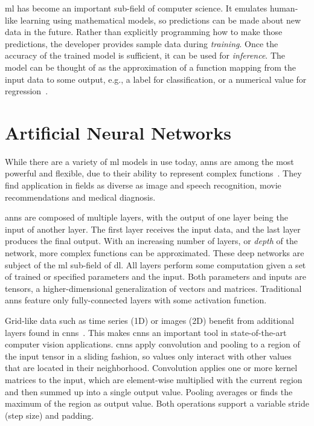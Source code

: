 \Gls{ml} has become an important sub-field of computer science. It emulates human-like learning using mathematical models, so predictions can be made about new data in the future. Rather than explicitly programming how to make those predictions, the developer provides sample data during \textit{training}. Once the accuracy of the trained model is sufficient, it can be used for \textit{inference}. The model can be thought of as the approximation of a function mapping from the input data to some output, e.g., a label for classification, or a numerical value for regression~\cite[p.~164]{IanGoodfellow.2016}.

\section{Artificial Neural Networks}
While there are a variety of \gls{ml} models in use today, \glspl{ann} are among the most powerful and flexible, due to their ability to represent complex functions~\cite[p.~163]{IanGoodfellow.2016}. They find application in fields as diverse as image and speech recognition, movie recommendations and medical diagnosis.

\Glspl{ann} are composed of multiple layers, with the output of one layer being the input of another layer. The first layer receives the input data, and the last layer produces the final output. With an increasing number of layers, or \textit{depth} of the network, more complex functions can be approximated. These deep networks are subject of the \gls{ml} sub-field of \gls{dl}. All layers perform some computation given a set of trained or specified parameters and the input. Both parameters and inputs are tensors, a higher-dimensional generalization of vectors and matrices. Traditional \glspl{ann} feature only fully-connected layers with some activation function.

Grid-like data such as time series (1D) or images (2D) benefit from additional layers found in \glspl{cnn}~\cite[p.~326]{IanGoodfellow.2016}. This makes \glspl{cnn} an important tool in state-of-the-art computer vision applications. \Glspl{cnn} apply convolution and pooling to a region of the input tensor in a sliding fashion, so values only interact with other values that are located in their neighborhood. Convolution applies one or more kernel matrices to the input, which are element-wise multiplied with the current region and then summed up into a single output value. Pooling averages or finds the maximum of the region as output value. Both operations support a variable stride (step size) and padding.

